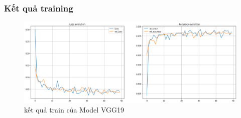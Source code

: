 \subsubsection{Kết quả training}
\begin{center}
    \begin{figure}[!h]
        \centering
        \includegraphics[scale = 0.38]{fileanh/30.png}
        \caption{kết quả train của Model VGG19}
    \end{figure}
\end{center}
